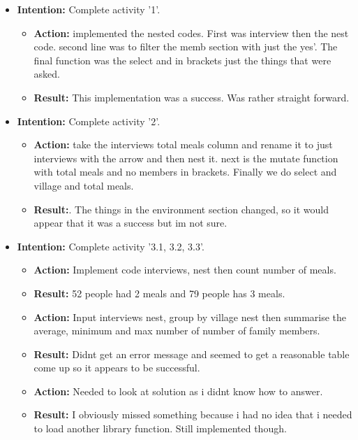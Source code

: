 \documentclass{article}
\begin{document}
\begin{itemize}

\item{\textbf{Intention:} Complete activity '1'.}

\begin{itemize}
\item{\textbf{Action:} implemented the nested codes. First was interview then the nest code. second line was to filter the memb section with just the yes'. The final function was the select and in brackets just the things that were asked.}
\item{\textbf{Result:} This implementation was a success. Was rather straight forward.}
\end{itemize}

\item{\textbf{Intention:} Complete activity '2'.}

\begin{itemize}
\item{\textbf{Action:} take the interviews total meals column and rename it to just interviews with the arrow and then nest it. next is the mutate function with total meals and no members in brackets. Finally we do select and village and total meals.}
\item{\textbf{Result:}. The things in the environment section changed, so it would appear that it was a success but im not sure.}
\end{itemize}

\item{\textbf{Intention:} Complete activity '3.1, 3.2, 3.3'.}

\begin{itemize}
\item{\textbf{Action:} Implement code interviews, nest then count number of meals.}
\item{\textbf{Result:} 52 people had 2 meals and 79 people has 3 meals.}

\item{\textbf{Action:} Input interviews nest, group by village nest then summarise the average, minimum and max number of number of family members.}
\item{\textbf{Result:} Didnt get an error message and seemed to get a reasonable table come up so it appears to be successful.}

\item{\textbf{Action:} Needed to look at solution as i didnt know how to answer.}
\item{\textbf{Result:} I obviously missed something because i had no idea that i needed to load another library function. Still implemented though.}



\end{itemize}
\end{itemize}
\end{document}

